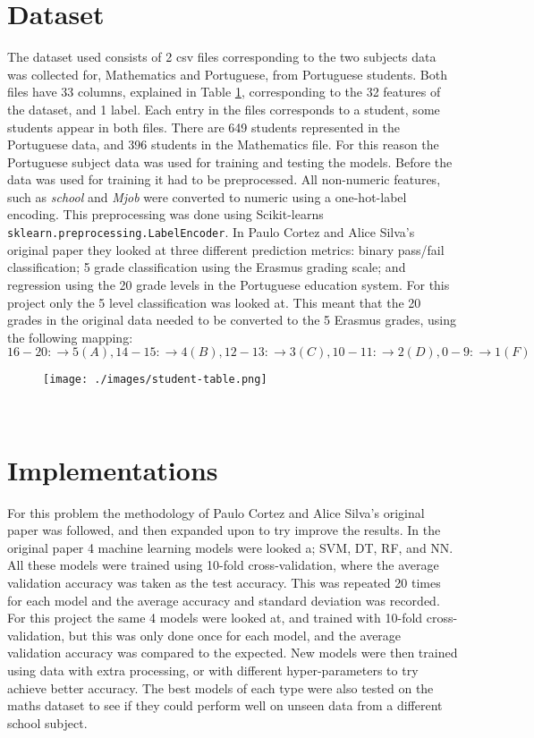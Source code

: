 \documentclass[12pt,a4paper,titlepage,twoside]{report}
\begin{document}
\section{Dataset}
	The dataset used consists of 2 csv files corresponding to the two subjects data was collected for, Mathematics and Portuguese, from Portuguese students. Both files have 33 columns, explained in Table \ref{tab:student-data}, corresponding to the 32 features of the dataset, and 1 label. Each entry in the files corresponds to a student, some students appear in both files. There are 649 students represented in the Portuguese data, and 396 students in the Mathematics file. For this reason the Portuguese subject data was used for training and testing the models. Before the data was used for training it had to be preprocessed. All non-numeric features, such as \textit{school} and \textit{Mjob} were converted to numeric using a one-hot-label encoding.  This preprocessing was done using Scikit-learns \texttt{sklearn.preprocessing.LabelEncoder}. In Paulo Cortez and Alice Silva's original paper\cite{student-dataset} they looked at three different prediction metrics: binary pass/fail classification; 5 grade classification using the Erasmus grading scale; and regression using the 20 grade levels in the Portuguese education system. For this project only the 5 level classification was looked at. This meant that the 20 grades in the original data needed to be converted to the 5 Erasmus grades, using the following mapping: $16-20 :\rightarrow 5 (A), 14-15 :\rightarrow 4 (B), 12-13 :\rightarrow 3 (C), 10-11 :\rightarrow 2 (D), 0-9 :\rightarrow 1 (F)$
	\begin{figure}[h]
  		\centering
  		\texttt{[image: ./images/student-table.png]}
  		\label{tab:student-data}
	\end{figure}\\

\section{Implementations}
	For this problem the methodology of Paulo Cortez and Alice Silva's original paper was followed, and then expanded upon to try improve the results. In the original paper 4 machine learning models were looked a; SVM, DT, RF, and NN. All these models were trained using 10-fold cross-validation, where the average validation accuracy was taken as the test accuracy. This was repeated 20 times for each model and the average accuracy and standard deviation was recorded. For this project the same 4 models were looked at, and trained with 10-fold cross-validation, but this was only done once for each model, and the average validation accuracy was compared to the expected. New models were then trained using data with extra processing, or with different hyper-parameters to try achieve better accuracy. The best models of each type were also tested on the maths dataset to see if they could perform well on unseen data from a different school subject.
\end{document}
